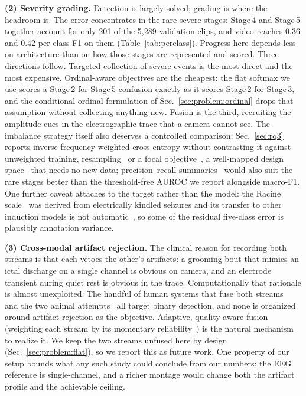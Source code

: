 \noindent\textbf{(2) Severity grading.}
Detection is largely solved; grading is where the headroom is. The error concentrates in the rare severe stages: Stage\,4 and Stage\,5 together account for only 201 of the 5{,}289 validation clips, and video reaches 0.36 and 0.42 per-class F1 on them (Table~\ref{tab:perclass}). Progress here depends less on architecture than on how
those stages are represented and scored. Three directions follow. Targeted collection
of severe events is the most direct and the most expensive. Ordinal-aware objectives
are the cheapest: the flat softmax we use scores a Stage\,2-for-Stage\,5 confusion
exactly as it scores Stage\,2-for-Stage\,3, and the conditional ordinal formulation of
Sec.~\ref{sec:problem:ordinal} drops that assumption without collecting anything new. Fusion is the third, recruiting the amplitude cues in the electrographic trace that a
camera cannot see. The imbalance strategy itself also deserves a controlled
comparison: Sec.~\ref{sec:rq3} reports inverse-frequency-weighted cross-entropy
without contrasting it against unweighted training,
resampling~\cite{chawla2002smote} or a focal objective~\cite{lin2017focal}, a
well-mapped design space~\cite{johnson2019imbalance} that needs no new data;
precision--recall summaries~\cite{saito2015prc} would also suit the rare stages better
than the threshold-free AUROC we report alongside macro-F1. One further caveat
attaches to the target rather than the model: the Racine scale~\cite{racine1972} was
derived from electrically kindled seizures and its transfer to other induction models
is not automatic~\cite{vanerum2019racine}, so some of the residual five-class error is
plausibly annotation variance.

\noindent\textbf{(3) Cross-modal artifact rejection.}
The clinical reason for recording both streams is that each vetoes the other's
artifacts: a grooming bout that mimics an ictal discharge on a single channel is
obvious on camera, and an electrode transient during quiet rest is obvious in the
trace. Computationally that rationale is almost unexploited. The handful of human
systems that fuse both
streams~\cite{aghaei_video_eeg,martini2021,cao2024,vepinet2024} and the two animal
attempts~\cite{mullen2024,eegvfusion2026} all target binary detection, and none is
organized around artifact rejection as the objective. Adaptive, quality-aware
fusion (weighting each stream by its momentary
reliability~\cite{frontiers_fusion2026,multimodal_review2026}) is the natural
mechanism to realize it. We keep the two streams unfused here by design
(Sec.~\ref{sec:problem:flat}), so we report this as future work. One property of our
setup bounds what any such study could conclude from our numbers: the EEG reference is
single-channel, and a richer montage would change both the artifact profile and the
achievable ceiling.

